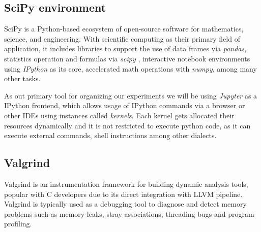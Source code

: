 \subsection{SciPy environment}
SciPy is a Python-based ecosystem of open-source software for mathematics, science, and engineering. With scientific computing as their primary field of application, it includes libraries to support the use of data frames via \textit{pandas}, statistics operation and formulas via \textit{scipy} , interactive notebook environments using \textit{IPython} as its core, accelerated math operations with \textit{numpy}, among many other tasks. 

As out primary tool for organizing our experiments we will be using \textit{Jupyter} as a IPython frontend, which allows usage of IPython commands via a browser or other IDEs using instances called \textit{kernels}. Each kernel gets allocated their resources dynamically and it is not restricted to execute python code, as it can execute external commands, shell instructions among other dialects.

\subsection{Valgrind}
Valgrind is an instrumentation framework for building dynamic analysis tools, popular with C developers due to its direct integration with LLVM pipeline. Valgrind is typically used as a debugging tool to diagnose and detect memory problems such as memory leaks, stray associations, threading bugs and program profiling.